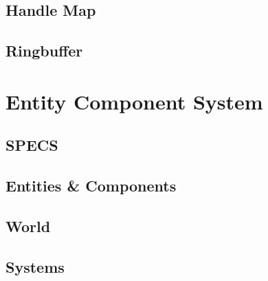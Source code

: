 \subsection{Handle Map}
\blindtext
\subsection{Ringbuffer}
\blindtext

\section{Entity Component System} \label{ecs_impl}
\blindtext
\subsection{SPECS}
\blindtext
\subsection{Entities \& Components}
\blindtext
\subsection{World}
\blindtext
\subsection{Systems}
\blindtext